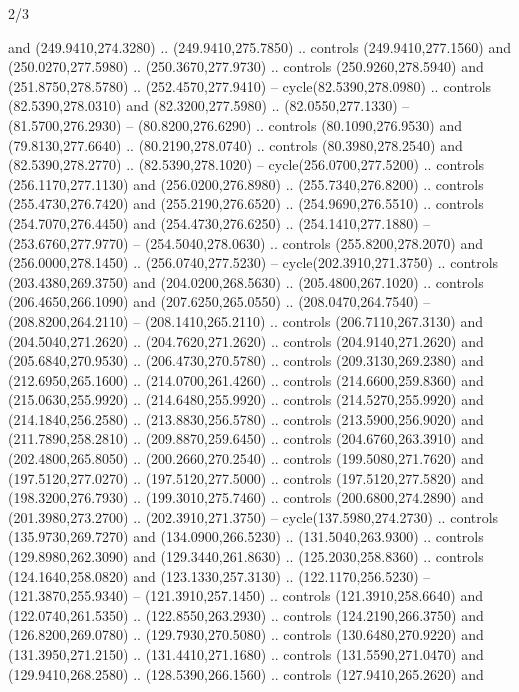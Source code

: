 \begin{flagdescription}{2/3}
\begin{scope}[xshift=0.5\flaglength,yshift=0.5\flagwidth,scale=\stretchfactor]
\begin{scope}[scale=0.001645\flagwidth,yshift=65mm,xshift=-63mm]
\begin{scope}[y=0.80pt, x=0.80pt, yscale=-1,]
\begin{scope}[cm={{1.33333,0.0,0.0,1.33333,(0.0,1e-05)}}]
  and (249.9410,274.3280) .. (249.9410,275.7850) .. controls (249.9410,277.1560)
  and (250.0270,277.5980) .. (250.3670,277.9730) .. controls (250.9260,278.5940)
  and (251.8750,278.5780) .. (252.4570,277.9410) -- cycle(82.5390,278.0980) ..
  controls (82.5390,278.0310) and (82.3200,277.5980) .. (82.0550,277.1330) --
  (81.5700,276.2930) -- (80.8200,276.6290) .. controls (80.1090,276.9530) and
  (79.8130,277.6640) .. (80.2190,278.0740) .. controls (80.3980,278.2540) and
  (82.5390,278.2770) .. (82.5390,278.1020) -- cycle(256.0700,277.5200) ..
  controls (256.1170,277.1130) and (256.0200,276.8980) .. (255.7340,276.8200) ..
  controls (255.4730,276.7420) and (255.2190,276.6520) .. (254.9690,276.5510) ..
  controls (254.7070,276.4450) and (254.4730,276.6250) .. (254.1410,277.1880) --
  (253.6760,277.9770) -- (254.5040,278.0630) .. controls (255.8200,278.2070) and
  (256.0000,278.1450) .. (256.0740,277.5230) -- cycle(202.3910,271.3750) ..
  controls (203.4380,269.3750) and (204.0200,268.5630) .. (205.4800,267.1020) ..
  controls (206.4650,266.1090) and (207.6250,265.0550) .. (208.0470,264.7540) --
  (208.8200,264.2110) -- (208.1410,265.2110) .. controls (206.7110,267.3130) and
  (204.5040,271.2620) .. (204.7620,271.2620) .. controls (204.9140,271.2620) and
  (205.6840,270.9530) .. (206.4730,270.5780) .. controls (209.3130,269.2380) and
  (212.6950,265.1600) .. (214.0700,261.4260) .. controls (214.6600,259.8360) and
  (215.0630,255.9920) .. (214.6480,255.9920) .. controls (214.5270,255.9920) and
  (214.1840,256.2580) .. (213.8830,256.5780) .. controls (213.5900,256.9020) and
  (211.7890,258.2810) .. (209.8870,259.6450) .. controls (204.6760,263.3910) and
  (202.4800,265.8050) .. (200.2660,270.2540) .. controls (199.5080,271.7620) and
  (197.5120,277.0270) .. (197.5120,277.5000) .. controls (197.5120,277.5820) and
  (198.3200,276.7930) .. (199.3010,275.7460) .. controls (200.6800,274.2890) and
  (201.3980,273.2700) .. (202.3910,271.3750) -- cycle(137.5980,274.2730) ..
  controls (135.9730,269.7270) and (134.0900,266.5230) .. (131.5040,263.9300) ..
  controls (129.8980,262.3090) and (129.3440,261.8630) .. (125.2030,258.8360) ..
  controls (124.1640,258.0820) and (123.1330,257.3130) .. (122.1170,256.5230) --
  (121.3870,255.9340) -- (121.3910,257.1450) .. controls (121.3910,258.6640) and
  (122.0740,261.5350) .. (122.8550,263.2930) .. controls (124.2190,266.3750) and
  (126.8200,269.0780) .. (129.7930,270.5080) .. controls (130.6480,270.9220) and
  (131.3950,271.2150) .. (131.4410,271.1680) .. controls (131.5590,271.0470) and
  (129.9410,268.2580) .. (128.5390,266.1560) .. controls (127.9410,265.2620) and

\end{scope}
\end{scope}
\end{scope}
\end{scope}
\end{flagdescription}
